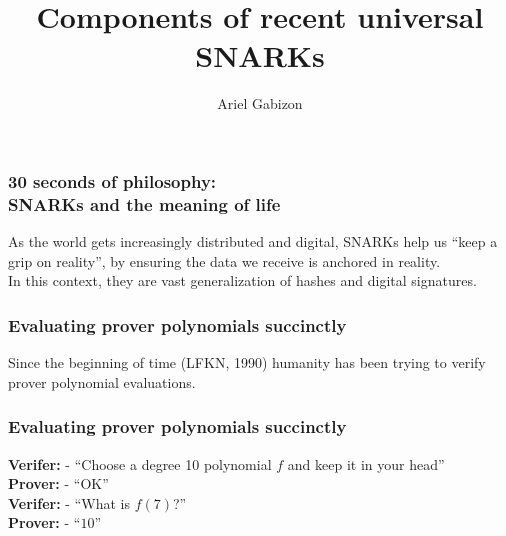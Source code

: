 \documentclass[shadesubsections,trans,14pt,mathserif]{beamer}
\title{\LARGE{Components of recent universal SNARKs}}    %
\author{\Large{Ariel Gabizon}}                 %
\institute{\normalsize{Protocol Labs}}      %
\date{}                    %
\begin{document}
\boldmath
\begin{frame}
  \titlepage
\end{frame}




\begin{frame}
  \frametitle{30 seconds of philosophy: \\ SNARKs and the meaning of life}   %

  
  As the world gets increasingly distributed and digital, SNARKs help us ``keep a grip on reality'', by ensuring the data we receive is anchored in reality.\\
 \vspace{0.4in}
 In this context, they are vast generalization of hashes and digital signatures.
 \vspace{0.4in}

\end{frame}



\begin{frame}
\frametitle{Evaluating prover polynomials succinctly}   %
Since the beginning of time (LFKN, 1990) humanity has been trying to verify prover polynomial evaluations.\\
\end{frame}


\begin{frame}
\frametitle{Evaluating prover polynomials succinctly}   %
 \vspace{0.4in}
\textbf{Verifer:} - ``Choose a degree 10 polynomial $f$ and keep it in your head''\\
\textbf{Prover:} - ``OK''\\
 \textbf{Verifer:} - ``What is $f(7)$?''\\
\textbf{Prover:} - ``$10$''\\
\end{frame}
\end{document}
